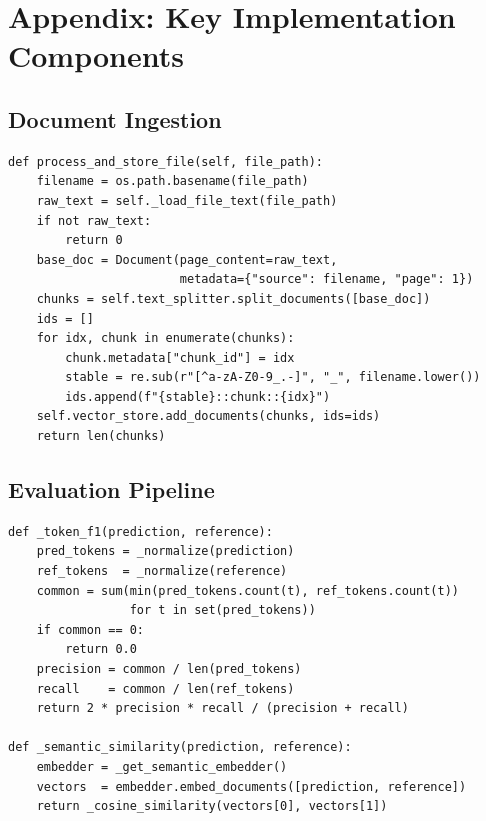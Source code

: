 \documentclass[12pt,a4paper]{article}
\begin{document}
\newpage
\section*{Appendix: Key Implementation Components}

\subsection*{Document Ingestion}
\begin{lstlisting}[caption={Chunking and storing documents in database.py}]
def process_and_store_file(self, file_path):
    filename = os.path.basename(file_path)
    raw_text = self._load_file_text(file_path)
    if not raw_text:
        return 0
    base_doc = Document(page_content=raw_text,
                        metadata={"source": filename, "page": 1})
    chunks = self.text_splitter.split_documents([base_doc])
    ids = []
    for idx, chunk in enumerate(chunks):
        chunk.metadata["chunk_id"] = idx
        stable = re.sub(r"[^a-zA-Z0-9_.-]", "_", filename.lower())
        ids.append(f"{stable}::chunk::{idx}")
    self.vector_store.add_documents(chunks, ids=ids)
    return len(chunks)
\end{lstlisting}

\subsection*{Evaluation Pipeline}
\begin{lstlisting}[caption={Token F1 and semantic similarity in evaluation.py}]
def _token_f1(prediction, reference):
    pred_tokens = _normalize(prediction)
    ref_tokens  = _normalize(reference)
    common = sum(min(pred_tokens.count(t), ref_tokens.count(t))
                 for t in set(pred_tokens))
    if common == 0:
        return 0.0
    precision = common / len(pred_tokens)
    recall    = common / len(ref_tokens)
    return 2 * precision * recall / (precision + recall)

def _semantic_similarity(prediction, reference):
    embedder = _get_semantic_embedder()
    vectors  = embedder.embed_documents([prediction, reference])
    return _cosine_similarity(vectors[0], vectors[1])
\end{lstlisting}
\end{document}
